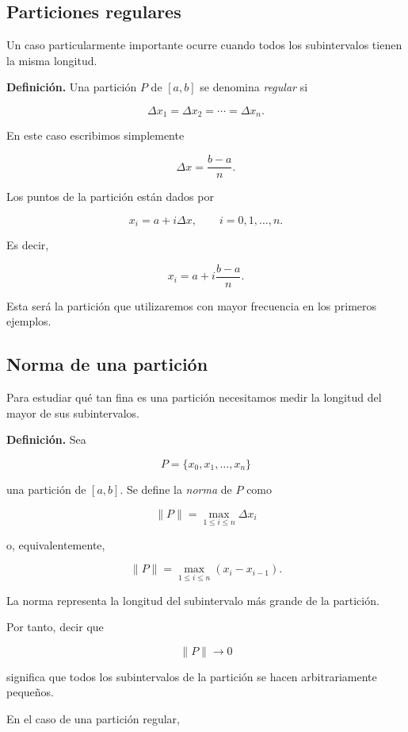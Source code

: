 \documentclass[12pt]{article}
\begin{document}
\subsection{Particiones regulares}

Un caso particularmente importante ocurre cuando todos los subintervalos
tienen la misma longitud.

\textbf{Definición.}
Una partición $P$ de $[a,b]$ se denomina \emph{regular} si

\[
\Delta x_1=\Delta x_2=\cdots=\Delta x_n.
\]

En este caso escribimos simplemente

\[
\Delta x=\frac{b-a}{n}.
\]

Los puntos de la partición están dados por

\[
x_i=a+i\Delta x,
\qquad i=0,1,\ldots,n.
\]

Es decir,

\[
x_i
=
a+i\frac{b-a}{n}.
\]

Esta será la partición que utilizaremos con mayor frecuencia en los
primeros ejemplos.

\subsection{Norma de una partición}

Para estudiar qué tan fina es una partición necesitamos medir la longitud
del mayor de sus subintervalos.

\textbf{Definición.}
Sea

\[
P=\{x_0,x_1,\ldots,x_n\}
\]

una partición de $[a,b]$. Se define la \emph{norma} de $P$ como

\[
\boxed{
\|P\|
=
\max_{1\leq i\leq n}
\Delta x_i
}
\]

o, equivalentemente,

\[
\|P\|
=
\max_{1\leq i\leq n}
(x_i-x_{i-1}).
\]

La norma representa la longitud del subintervalo más grande de la
partición.

Por tanto, decir que

\[
\|P\|\longrightarrow0
\]

significa que todos los subintervalos de la partición se hacen
arbitrariamente pequeños.

En el caso de una partición regular,
\end{document}
